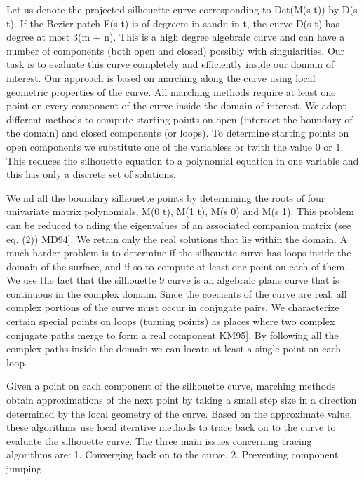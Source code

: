 \documentclass[11pt,letterpaper]{article}
\newcommand{\SectionHeading}[2]{%
  \par\noindent{\fontsize{12}{14}\selectfont\bfseries%
  \if\relax\detokenize{#1}\relax
    #2%
  \else
    #1\hspace{0.35in}#2%
  \fi\par}\vspace{0.1em}%
}
\begin{document}
\SectionHeading{3.2}{Silhouette Computation}
Let us denote the projected silhouette curve corresponding to Det(M(s t)) by D(s t). If the Bezier patch F(s t) is of degreem in sandn in t, the curve D(s t) has degree at most 3(m + n). This is a high degree algebraic curve and can have a number of components (both open and closed) possibly with singularities. Our task is to evaluate this curve completely and efficiently inside our domain of interest. Our approach is based on marching along the curve using local geometric properties of the curve. All marching methods require at least one point on every component of the curve inside the domain of interest. We adopt different methods to compute starting points on open (intersect the boundary of the domain) and closed components (or loops). To determine starting points on open components we substitute one of the variabless or twith the value 0 or 1. This reduces the silhouette equation to a polynomial equation in one variable and this has only a discrete set of solutions.

We nd all the boundary silhouette points by determining the roots of four univariate matrix polynomials, M(0 t), M(1 t), M(s 0) and M(s 1). This problem can be reduced to nding the eigenvalues of an associated companion matrix (see eq. (2)) MD94]. We retain only the real solutions that lie within the domain. A much harder problem is to determine if the silhouette curve has loops inside the domain of the surface, and if so to compute at least one point on each of them. We use the fact that the silhouette 9 curve is an algebraic plane curve that is continuous in the complex domain. Since the coecients of the curve are real, all complex portions of the curve must occur in conjugate pairs. We characterize certain special points on loops (turning points) as places where two complex conjugate paths merge to form a real component KM95]. By following all the complex paths inside the domain we can locate at least a single point on each loop.

Given a point on each component of the silhouette curve, marching methods obtain approximations of the next point by taking a small step size in a direction determined by the local geometry of the curve. Based on the approximate value, these algorithms use local iterative methods to trace back on to the curve to evaluate the silhouette curve. The three main issues concerning tracing algorithms are: 1. Converging back on to the curve. 2. Preventing component jumping.
\end{document}
